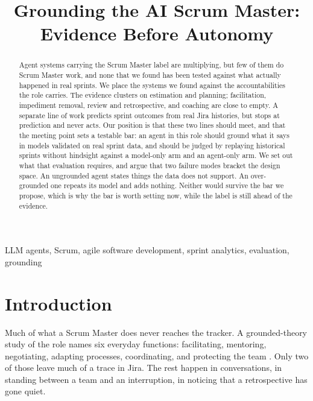 \documentclass[conference]{IEEEtran}
\begin{document}
\title{Grounding the AI Scrum Master: Evidence Before Autonomy}
\author{
}
\date{}
\maketitle

\begin{abstract}
Agent systems carrying the Scrum Master label are multiplying, but few of them do Scrum Master work, and none that we found has been tested against what actually happened in real sprints. We place the systems we found against the accountabilities the role carries. The evidence clusters on estimation and planning; facilitation, impediment removal, review and retrospective, and coaching are close to empty. A separate line of work predicts sprint outcomes from real Jira histories, but stops at prediction and never acts. Our position is that these two lines should meet, and that the meeting point sets a testable bar: an agent in this role should ground what it says in models validated on real sprint data, and should be judged by replaying historical sprints without hindsight against a model-only arm and an agent-only arm. We set out what that evaluation requires, and argue that two failure modes bracket the design space. An ungrounded agent states things the data does not support. An over-grounded one repeats its model and adds nothing. Neither would survive the bar we propose, which is why the bar is worth setting now, while the label is still ahead of the evidence.
\end{abstract}

\begin{IEEEkeywords}
LLM agents, Scrum, agile software development, sprint analytics, evaluation, grounding
\end{IEEEkeywords}

\section{Introduction}

Much of what a Scrum Master does never reaches the tracker. A grounded-theory study of the role names six everyday functions: facilitating, mentoring, negotiating, adapting processes, coordinating, and protecting the team \cite{shastri}. Only two of those leave much of a trace in Jira. The rest happen in conversations, in standing between a team and an interruption, in noticing that a retrospective has gone quiet.
\end{document}
